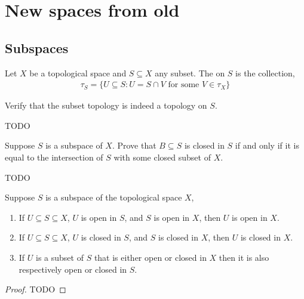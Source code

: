\chapter{New spaces from old}
\section{Subspaces}
\begin{definition}
	Let $ X $ be a topological space and $ S \subseteq X $ any subset. The  on $ S $ is the collection,
	\begin{align*}
		\tau_{S} = \{ U \subseteq S : U = S \cap V \text{ for some } V \in \tau_{X} \}
	\end{align*}
\end{definition}

\begin{exercise}
	\begin{problem}
	Verify that the subset topology is indeed a topology on $ S $.
	\end{problem}
	\begin{solution}
		TODO
	\end{solution}
\end{exercise}

\begin{exercise}
	\begin{problem}
	Suppose $ S $ is a subspace of $ X $. Prove that $ B \subseteq S $ is closed in $ S $ if and only if it is equal to the intersection of $ S $ with some closed subset of $ X $.
	\end{problem}
	\begin{solution}
		TODO
	\end{solution}
\end{exercise}

\begin{proposition}
	Suppose $ S $ is a subspace of the topological space $ X $,
	\begin{enumerate}
		\item If $ U \subseteq S \subseteq X $, $ U $ is open in $ S $, and $ S $ is open in $ X $, then $ U $ is open in $ X $.
		\item If $ U \subseteq S \subseteq X $, $ U $ is closed in $ S $, and $ S $ is closed in $ X $, then $ U $ is closed in $ X $.
		\item If $ U $ is a subset of $ S $ that is either open or closed in $ X $ then it is also respectively open or closed in $ S $.
	\end{enumerate}
	\begin{proof}
		TODO
	\end{proof}
\end{proposition}

